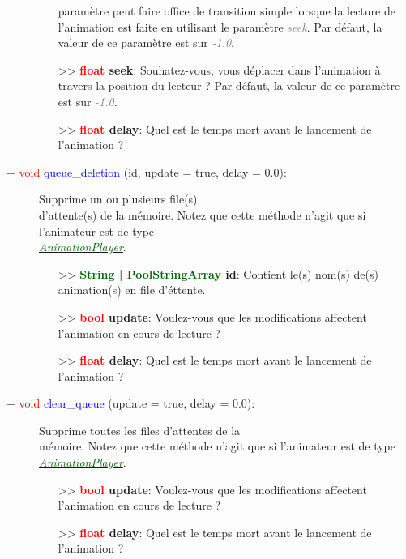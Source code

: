 \documentclass[a4paper, 11pt]{article}
\begin{document}
\begin{description}
\begin{itemize}
			paramètre peut faire office de transition simple lorsque la lecture de l'animation est faite en 
			utilisant le paramètre \textcolor{gray}{\textit{seek}}. Par défaut, la valeur de ce paramètre 
			est sur \textcolor{gray}{\textit{-1.0}}.
			\item [>> \textbf{\textcolor{red}{float} seek}:] Souhatez-vous, vous déplacer dans l'animation à
			travers la position du lecteur ? Par défaut, la valeur de ce paramètre est sur \textcolor{gray}
			{\textit{-1.0}}.
			\item [>> \textbf{\textcolor{red}{float} delay}:] Quel est le temps mort avant le lancement de 
			l'animation ?\\
		\end{itemize}
	\end{description}
	\begin{description}
		\item [+ \textcolor{red}{void} \textcolor{blue}{queue\_deletion} (id, update = true, delay = 0.0):] 
		Supprime un ou plusieurs file(s) \\d'attente(s) de la mémoire. Notez que cette méthode n'agit que si 
		l'animateur est de type
		\href{https://docs.godotengine.org/en/stable/classes/class_animationplayer.html}
		{\textit{\textcolor{darkgreen}{\\AnimationPlayer}}}.
		\begin{itemize}
			\item [>> \textbf{\textcolor{darkgreen}{String | PoolStringArray} id}:] Contient le(s) nom(s) 
			de(s) animation(s) en file d'éttente.
			\item [>> \textbf{\textcolor{red}{bool} update}:] Voulez-vous que les modifications affectent 
			l'animation en cours de lecture ? 
			\item [>> \textbf{\textcolor{red}{float} delay}:] Quel est le temps mort avant le lancement de 
			l'animation ?\\
		\end{itemize}
	\end{description}
	\begin{description}
		\item [+ \textcolor{red}{void} \textcolor{blue}{clear\_queue} (update = true, delay = 0.0):] 
		Supprime toutes les files d'attentes de la \\mémoire. Notez que cette méthode n'agit que si 
		l'animateur est de type
		\href{https://docs.godotengine.org/en/stable/classes/class_animationplayer.html}
		{\textit{\textcolor{darkgreen}{AnimationPlayer}}}.
		\begin{itemize}
			\item [>> \textbf{\textcolor{red}{bool} update}:] Voulez-vous que les modifications affectent 
			l'animation en cours de lecture ? 
			\item [>> \textbf{\textcolor{red}{float} delay}:] Quel est le temps mort avant le lancement de 
			l'animation ?\\
		\end{itemize}
	\end{description}
\end{document}
